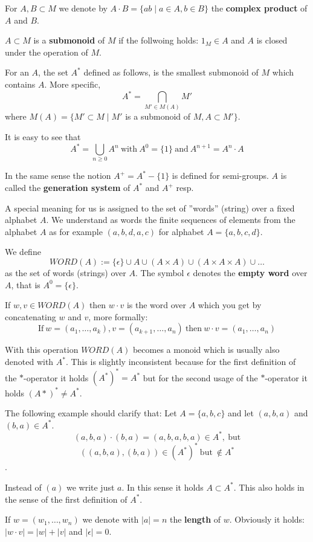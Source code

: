 For $A,B \subset M$ we denote by $A \cdot B = \{ a b \mid a \in A, b \in B \}$
the {\bf complex product} of $A$ and $B$.

$A \subset M$ is a {\bf submonoid} of $M$ if the follwoing holds: $1_M \in A$
and $A$ is closed under the operation of $M$.

For an $A$, the set $A^*$ defined as follows, is the smallest submonoid of $M$
which contains $A$. More specific,
\[
		A^* = \bigcap_{M' \in M(A)} M'	
\]
where $M(A) = \{ M' \subset M \mid M'$ is a submonoid of $M, A \subset M' \}$.

It is easy to see that
\[
		A^* = \bigcup_{n \geq 0} A^n\ \mbox{with}\ A^0 = \{1\}\ \mbox{and}\ A^{n+1} =
		A^n \cdot A
\]

In the same sense the notion $A^+ = A^* - \{1\}$ is defined for semi-groups. $A$
is called the {\bf generation system} of $A^*$ and $A^+$ resp.

A special meaning for us is assigned to the set of ''words'' (string) over a
fixed alphabet $A$. We understand as words the finite sequences of elements from
the alphabet $A$ as for example $(a,b,d,a,c)$ for alphabet $A = \{ a,b,c,d \}$.

We define
\[
WORD(A) := \{\epsilon\} \cup A \cup (A \times A) \cup (A \times A \times A) \cup
\ldots
\]
as the set of words (strings) over $A$. The symbol $\epsilon$ denotes the {\bf
empty word} over $A$, that is $A^0 = \{\epsilon\}$.

If $w, v \in WORD(A)$ then $w \cdot v$ is the word over $A$ which you get by
concatenating $w$ and $v$, more formally:
\[
\mbox{If}\ w = (a_1,\ldots,a_k), v = (a_{k+1},\ldots,a_n)\ \mbox{then}\ w \cdot
v = (a_1, \ldots, a_n)
\]

With this operation $WORD(A)$ becomes a monoid which is usually also denoted
with $A^*$. This is slightly inconsistent because for the first definition of
the $*$-operator it holds $(A^*)^* = A^*$ but for the second usage of the
$*$-operator it holds $(A*)^* \neq A^*$.

The following example should clarify that: Let $A = \{a,b,c\}$ and let $(a,b,a)$
and $(b,a) \in A^*$.
\[(a,b,a)\cdot(b,a) = (a,b,a,b,a) \in A^*,\ \mbox{but}\]
\[((a,b,a),(b,a)) \in (A^*)^*\ \mbox{but}\ \notin A^*\].


Instead of $(a)$ we write just $a$. In this sense it holds $A \subset A^*$. This
also holds in the sense of the first definition of $A^*$.

If $w = (w_1,\ldots,w_n)$ we denote with $|a| = n$ the {\bf length} of $w$.
Obviously it holds: $|w \cdot v| = |w| + |v|$ and $|\epsilon| = 0$.

